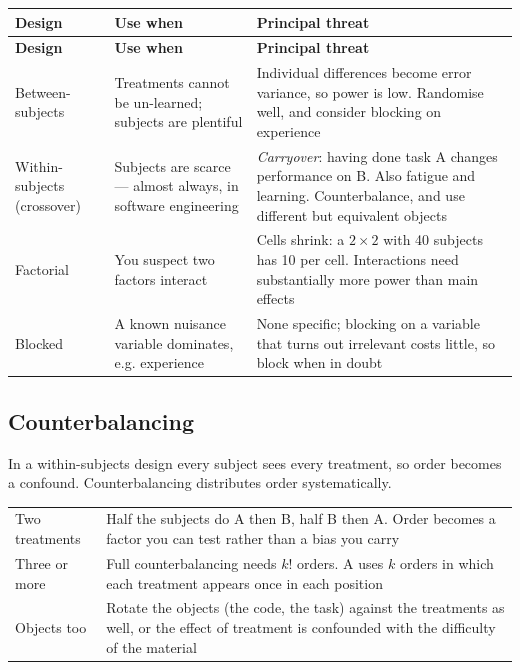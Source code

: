 \begin{center}
\small
\begin{longtable}{@{}L{2.6cm}L{5.4cm}L{6.0cm}@{}}
\toprule
\textbf{Design} & \textbf{Use when} & \textbf{Principal threat} \\
\midrule
\endfirsthead
\toprule
\textbf{Design} & \textbf{Use when} & \textbf{Principal threat} \\
\midrule
\endhead
\bottomrule
\endfoot
Between-subjects
  & Treatments cannot be un-learned; subjects are plentiful
  & Individual differences become error variance, so power is low. Randomise
    well, and consider blocking on experience \\
Within-subjects (crossover)
  & Subjects are scarce --- almost always, in software engineering
  & \emph{Carryover}: having done task A changes performance on B. Also
    fatigue and learning. Counterbalance, and use different but equivalent
    objects \\
Factorial
  & You suspect two factors interact
  & Cells shrink: a $2\times2$ with 40 subjects has 10 per cell. Interactions
    need substantially more power than main effects \\
Blocked
  & A known nuisance variable dominates, e.g. experience
  & None specific; blocking on a variable that turns out irrelevant costs
    little, so block when in doubt \\
\bottomrule
\end{longtable}
\end{center}

\subsection{Counterbalancing}

In a within-subjects design every subject sees every treatment, so order
becomes a confound. Counterbalancing distributes order systematically.

\begin{center}
\small
\begin{tabular}{@{}L{2.8cm}L{11.5cm}@{}}
\toprule
Two treatments  & Half the subjects do A then B, half B then A. Order becomes a
                  factor you can test rather than a bias you carry \\
Three or more   & Full counterbalancing needs $k!$ orders. A  uses $k$ orders in which each treatment appears once
                  in each position \\
Objects too     & Rotate the objects (the code, the task) against the
                  treatments as well, or the effect of treatment is confounded
                  with the difficulty of the material \\
\bottomrule
\end{tabular}
\end{center}

